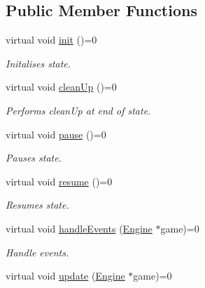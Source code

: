 \subsection*{Public Member Functions}
\begin{DoxyCompactItemize}
\item 
\hypertarget{class_state_a2ff5faa41a5811007e8d50542365640b}{virtual void \hyperlink{class_state_a2ff5faa41a5811007e8d50542365640b}{init} ()=0}\label{class_state_a2ff5faa41a5811007e8d50542365640b}

\begin{DoxyCompactList}\small\item\em Initalises state. \end{DoxyCompactList}\item 
\hypertarget{class_state_a83d0132231b6cc7334d98926f6b61da5}{virtual void \hyperlink{class_state_a83d0132231b6cc7334d98926f6b61da5}{clean\-Up} ()=0}\label{class_state_a83d0132231b6cc7334d98926f6b61da5}

\begin{DoxyCompactList}\small\item\em Performs clean\-Up at end of state. \end{DoxyCompactList}\item 
\hypertarget{class_state_ad8530393b468e4494f965f61259c84c4}{virtual void \hyperlink{class_state_ad8530393b468e4494f965f61259c84c4}{pause} ()=0}\label{class_state_ad8530393b468e4494f965f61259c84c4}

\begin{DoxyCompactList}\small\item\em Pauses state. \end{DoxyCompactList}\item 
\hypertarget{class_state_a6397f6c277e077f5284f06c9902b63ee}{virtual void \hyperlink{class_state_a6397f6c277e077f5284f06c9902b63ee}{resume} ()=0}\label{class_state_a6397f6c277e077f5284f06c9902b63ee}

\begin{DoxyCompactList}\small\item\em Resumes state. \end{DoxyCompactList}\item 
\hypertarget{class_state_a94baa51f73b5ebc734328149f504e863}{virtual void \hyperlink{class_state_a94baa51f73b5ebc734328149f504e863}{handle\-Events} (\hyperlink{class_engine}{Engine} $\ast$game)=0}\label{class_state_a94baa51f73b5ebc734328149f504e863}

\begin{DoxyCompactList}\small\item\em Handle events. \end{DoxyCompactList}\item 
\hypertarget{class_state_a59328638adca519ab9f71aeea59620fa}{virtual void \hyperlink{class_state_a59328638adca519ab9f71aeea59620fa}{update} (\hyperlink{class_engine}{Engine} $\ast$game)=0}\label{class_state_a59328638adca519ab9f71aeea59620fa}


\end{DoxyCompactItemize}
